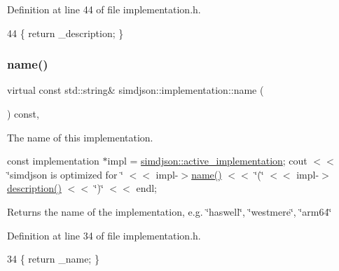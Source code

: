 Definition at line 44 of file implementation.\+h.


\begin{DoxyCode}
44 \{ \textcolor{keywordflow}{return} \_description; \}
\end{DoxyCode}
\mbox{\label{classsimdjson_1_1implementation_a404c32ec6187ac0fb5b2ec6b5aea4abd}} 
\subsubsection{\texorpdfstring{name()}{name()}}
{\footnotesize\ttfamily virtual const std\+::string\& simdjson\+::implementation\+::name (\begin{DoxyParamCaption}{ }\end{DoxyParamCaption}) const\hspace{0.3cm}{\ttfamily [inline]}, {\ttfamily [virtual]}}



The name of this implementation. 

const implementation $\ast$impl = \hyperlink{namespacesimdjson_a9ed6efb6da2dda95f75256aaf1d0b9b4}{simdjson\+::active\+\_\+implementation}; cout $<$$<$ \char`\"{}simdjson is optimized for \char`\"{} $<$$<$ impl-\/$>$\hyperlink{classsimdjson_1_1implementation_a404c32ec6187ac0fb5b2ec6b5aea4abd}{name()} $<$$<$ \char`\"{}(\char`\"{} $<$$<$ impl-\/$>$\hyperlink{classsimdjson_1_1implementation_a4f41daefefc573e20fccd591b158e063}{description()} $<$$<$ \char`\"{})\char`\"{} $<$$<$ endl;

\begin{DoxyReturn}{Returns}
the name of the implementation, e.\+g. \char`\"{}haswell\char`\"{}, \char`\"{}westmere\char`\"{}, \char`\"{}arm64\char`\"{} 
\end{DoxyReturn}


Definition at line 34 of file implementation.\+h.


\begin{DoxyCode}
34 \{ \textcolor{keywordflow}{return} \_name; \}
\end{DoxyCode}
\mbox{\label{classsimdjson_1_1implementation_ab91b208c5104e565702cfeb9797533bf}} 
